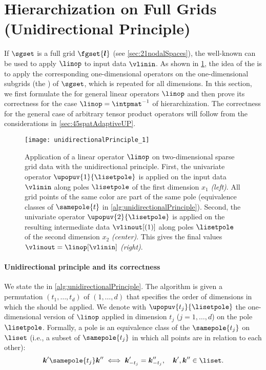 \section{Hierarchization on Full Grids (Unidirectional Principle)}
\label{sec:42fullGrids}

If $\sgset$ is a full grid $\fgset{\*l}$
(see \cref{sec:21nodalSpaces}),
the well-known \term{\up}
can be used to apply $\linop$ to input data $\vlinin$.
As shown in \cref{fig:unidirectionalPrinciple}, the idea of the \up
is to apply the corresponding one-dimensional operators on the
one-dimensional subgrids (the ) of $\sgset$,
which is repeated for all dimensions.
In this section, we first formulate the \up for
general linear operators $\linop$ and then prove its correctness for
the case $\linop = \intpmatinv$ of hierarchization.
The correctness for the general case of arbitrary tensor product operators
will follow from the considerations in \cref{sec:45spatAdaptiveUP}.

\begin{figure}
  \texttt{[image: unidirectionalPrinciple\_1]}%
  \caption[%
    Unidirectional principle%
  ]{%
    Application of a linear operator $\linop$
    on two-dimensional sparse grid data with the unidirectional principle.
    First, the univariate operator $\upopuv{1}{\lisetpole}$ is applied on
    the input data $\vlinin$
    along poles $\lisetpole$ of the first dimension $x_1$ \emph{(left)}.
    All grid points of the same color are part of the same pole
    (equivalence classes of $\samepole{t}$ in
    \cref{alg:unidirectionalPrinciple}).
    Second, the univariate operator $\upopuv{2}{\lisetpole}$ is applied on the
    resulting intermediate data $\vlinout[(1)]$
    along poles $\lisetpole$ of the second dimension $x_2$ \emph{(center)}.
    This gives the final values $\vlinout = \linop[\vlinin]$ \emph{(right)}.%
  }%
  \label{fig:unidirectionalPrinciple}%
\end{figure}

\paragraph{Unidirectional principle and its correctness}

We state the \up in \cref{alg:unidirectionalPrinciple}.
The algorithm is given a permutation $(t_1, \dotsc, t_d)$ of $(1, \dotsc, d)$
that specifies the order of dimensions in which the \up should be applied.
We denote with $\upopuv{t_j}{\lisetpole}$ the one-dimensional version of $\linop$
applied in dimension $t_j$ ($j = 1, \dotsc, d$) on the pole $\lisetpole$.
Formally, a pole is an equivalence class of the
 $\samepole{t_j}$ on $\liset$
(i.e., a subset of $\samepole{t_j}$
in which all points are in relation to each other):
\begin{equation}
  \label{eq:poleEquivalenceRelation}
  \*k' \samepole{t_j} \*k'' \iff \*k'_{-t_j} = \*k''_{-t_j},\quad
  \*k', \*k'' \in \liset.
\end{equation}

